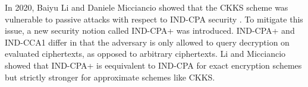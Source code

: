 In 2020, Baiyu Li and Daniele Micciancio showed that the CKKS scheme was vulnerable to passive attacks with respect to IND-CPA security \cite{CKKS-attack}. To mitigate this issue, a new security notion called IND-CPA+ was introduced. IND-CPA+ and IND-CCA1 differ in that the adversary is only allowed to query decryption on evaluated ciphertexts, as opposed to arbitrary ciphertexts. Li and Micciancio showed that IND-CPA+ is eequivalent to IND-CPA for exact encryption schemes but strictly stronger for approximate schemes like CKKS. 

